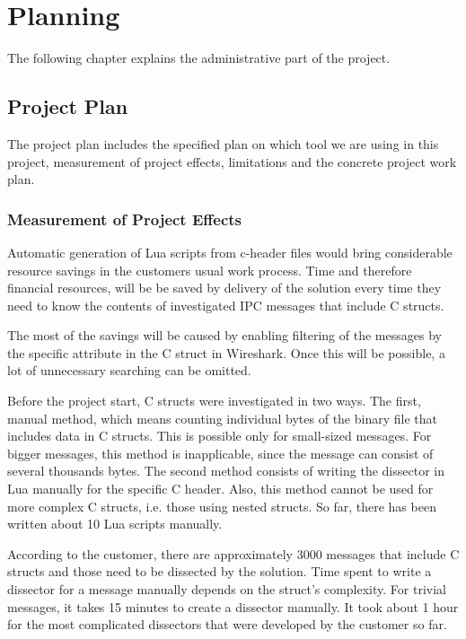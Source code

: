 \chapter{Planning}
The following chapter explains the administrative part of the project.

\section{Project Plan}
The project plan includes the specified plan on which tool we are using in this project, measurement of project effects, limitations and the concrete project work plan.

\subsection{Measurement of Project Effects}
Automatic generation of Lua scripts from c-header files would bring considerable resource savings in the customers usual work process. Time and therefore financial resources, will be  be saved by delivery of the solution every time they need to know the contents of investigated IPC messages that include C structs.

The most of the savings will be caused by enabling filtering of the messages by the specific attribute in the C struct in Wireshark. Once this will be possible, a lot of unnecessary searching can be omitted.

Before the project start, C structs were investigated in two ways. The first, manual method, which means counting individual bytes of the binary file that includes data in C structs. This is possible only for small-sized messages. For bigger messages, this method is inapplicable, since the message can consist of several thousands bytes. The second method consists of writing the dissector in Lua manually for the specific C header. Also, this method cannot be used for more complex C structs, i.e. those using nested structs. So far, there has been written about 10 Lua scripts manually.

According to the customer, there are approximately 3000 messages that include C structs and those need to be dissected by the solution. Time spent to write a dissector for a message manually depends on the struct’s complexity. For trivial messages, it takes 15 minutes to create a dissector manually. It took about 1 hour for the most complicated dissectors that were developed by the customer so far.

